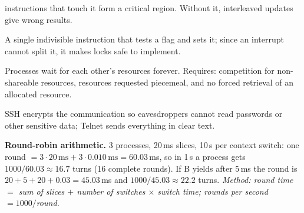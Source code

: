 \documentclass{fkt-notes}
\begin{document}
\begin{description}[leftmargin=0pt,labelindent=0pt,itemsep=3pt]
        instructions that touch it form a critical region. Without it, interleaved updates give wrong results.
  \item[Test-and-set.] A single indivisible instruction that tests a flag and sets it; since an
        interrupt cannot split it, it makes locks safe to implement.
  \item[Deadlock.] Processes wait for each other's resources forever. Requires: competition for
        non-shareable resources, resources requested piecemeal, and no forced retrieval of an allocated resource.
  \item[Telnet vs.\ SSH (key).] SSH encrypts the communication so eavesdroppers cannot read
        passwords or other sensitive data; Telnet sends everything in clear text.
\end{description}

\textbf{Round-robin arithmetic.} 3 processes, 20\,ms slices, 10\,\textmu s per context switch:
one round $=3\cdot20\,\text{ms}+3\cdot0.010\,\text{ms}=60.03$\,ms, so in 1\,s a process gets
$1000/60.03\approx16.7$ turns (16 complete rounds). If B yields after 5\,ms the round is
$20+5+20+0.03=45.03$\,ms and $1000/45.03\approx22.2$ turns.
\emph{Method: round time $=$ sum of slices $+$ number of switches $\times$ switch time; rounds per second $=1000/$round.}
\end{document}
